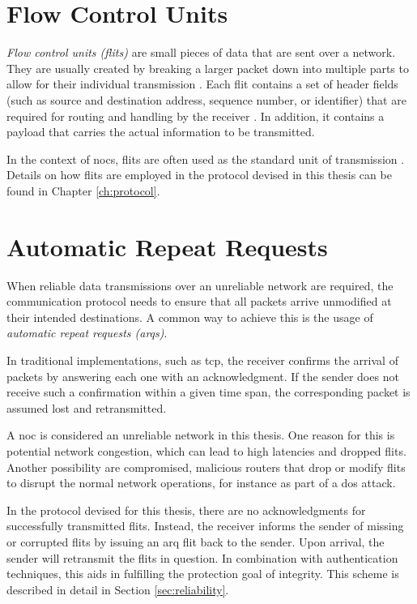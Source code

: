 %
\section{Flow Control Units}\label{sec:flitsfun}
\textit{Flow control units (flits)} are small pieces of data that are sent over a network. They are usually created by breaking a larger
packet down into multiple parts to allow for their individual transmission \cite[6]{flitslecturecmu}. Each flit contains a set of header fields (such as source and
destination address, sequence number, or identifier) that are required for routing and handling by the receiver \cite[2]{flitslectureutah}.
In addition, it contains a payload that carries the actual information to be transmitted. %

In the context of \glspl{noc}, flits are often used as the standard unit of transmission \cite[51\psqq]{tatas16designingnocs}. Details on how flits
are employed in the protocol devised in this thesis can be found in Chapter \ref{ch:protocol}.

\section{Automatic Repeat Requests}\label{sec:arqs}
When reliable data transmissions over an unreliable network are required, the communication protocol needs to ensure that all packets arrive unmodified
at their intended destinations. A common way to achieve this is the usage of \textit{automatic repeat requests (\glspl{arq})}.

In traditional implementations, such as \gls{tcp}, the receiver confirms the arrival of packets by answering each one with an acknowledgment.
If the sender does not receive such a confirmation within a given time span, the corresponding packet is assumed lost and retransmitted.

A \gls{noc} is considered an unreliable network in this thesis. One reason for this is potential network congestion, which can lead to high latencies
and dropped flits. Another possibility are compromised, malicious routers that drop or modify flits to disrupt the normal network operations, for
instance as part of a \gls{dos} attack.

In the protocol devised for this thesis, there are no acknowledgments for successfully transmitted flits. Instead, the receiver informs the sender of missing or corrupted
flits by issuing an \gls{arq} flit back to the sender. Upon arrival, the sender will retransmit the flits in question. In combination with
authentication techniques, this aids in fulfilling the protection goal of integrity. This scheme is described in detail in Section
\ref{sec:reliability}.

